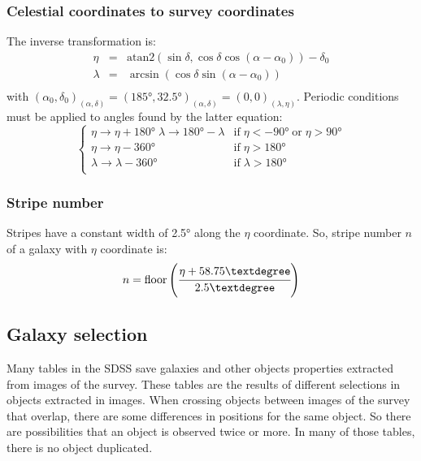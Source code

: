 \subsubsection{Celestial coordinates to survey coordinates}

The inverse transformation is:
%
\begin{eqnarray} \eta &=& \mathrm{atan2}
\left(\sin\delta,\cos\delta\cos\left(\alpha-\alpha_0\right)\right)-
\delta_0\nonumber\\ \lambda &=&
\arcsin\left(\cos\delta\sin\left(\alpha-\alpha_0\right)\right) \nonumber\\
\end{eqnarray}
%
with ${\left(\alpha_0,\delta_0\right)}_{\left(\alpha,\delta\right)}=
{\left(185°,32.5°\right)}_{\left(\alpha,\delta\right)}=
{\left(0,0\right)}_{\left(\lambda,\eta\right)}$. Periodic conditions must be
applied to angles found by the latter equation:
%
\begin{equation} \begin{cases} \eta\rightarrow\eta+180° \;
    \lambda\rightarrow180°-\lambda& \mbox{if}\;\eta<-90°\;\mbox{or}\;
    \eta>90°\\ \eta\rightarrow\eta-360° & \mbox{if}\;\eta>180°\\
    \lambda\rightarrow\lambda-360° & \mbox{if}\;\lambda>180°\\ \end{cases}
\end{equation}
%
\subsubsection{Stripe number}
%
Stripes have a constant width of 2.5° along the $\eta$ coordinate. So, stripe
number $n$ of a galaxy with $\eta$ coordinate is:
%
\begin{equation} n = \mathrm{floor}\left(\cfrac{\eta+58.75°}{2.5°}\right)
\end{equation}
%
\subsection{Galaxy selection}
%
Many tables in the SDSS save galaxies and other objects properties extracted
from images of the survey. These tables are the results of different selections
in objects extracted in images. When crossing objects between images of the
survey that overlap, there are some differences in positions for the same
object. So there are possibilities that an object is observed twice or more. In
many of those tables, there is no object duplicated.

